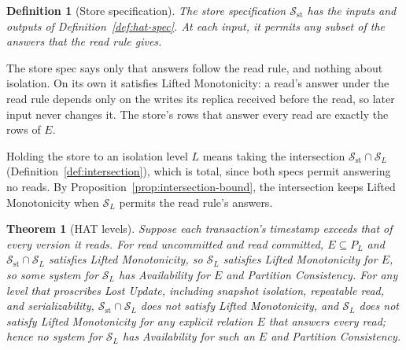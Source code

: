 \documentclass[sigconf]{cidr-2027}
\newtheorem{theorem}{Theorem}
\newtheorem{definition}{Definition}
\theoremstyle{remark}
\newcommand{\Spec}{\mathcal{S}}
\begin{document}
\begin{definition}[Store specification]
\label{def:store-spec}
The \emph{store specification} $\Spec_{\mathrm{st}}$ has the inputs and outputs
of Definition~\ref{def:hat-spec}. At each input, it permits any subset of the
answers that the read rule gives.
\end{definition}

The store spec says only that answers follow the read rule, and nothing about
isolation. On its own it satisfies Lifted Monotonicity: a read's answer under the read rule depends only on the writes its replica received
before the read, so later input never changes it. The store's rows that answer
every read are exactly the rows of $E$.

Holding the store to an isolation level $L$ means taking the intersection
$\Spec_{\mathrm{st}}\cap\Spec_L$ (Definition~\ref{def:intersection}), which
is total, since both specs permit
answering no reads. By Proposition~\ref{prop:intersection-bound}, the
intersection keeps Lifted Monotonicity when $\Spec_L$ permits the read rule's
answers.

\begin{theorem}[HAT levels]
\label{thm:hat-levels}
\textcolor{reviewed}{Suppose each transaction's timestamp exceeds that of every version it reads.} \textcolor{reviewed}{For read uncommitted and read committed, $E\subseteq P_L$ and
$\Spec_{\mathrm{st}}\cap\Spec_L$ satisfies Lifted Monotonicity, so $\Spec_L$
satisfies Lifted Monotonicity for $E$, so some system for $\Spec_L$ has
Availability for $E$ and Partition Consistency.} For any level that proscribes
Lost Update, including snapshot isolation, repeatable read, and
serializability, $\Spec_{\mathrm{st}}\cap\Spec_L$ does not satisfy Lifted
Monotonicity, and $\Spec_L$ does not satisfy Lifted Monotonicity for any
explicit relation $E$ that answers every read; hence no system for $\Spec_L$
has Availability for such an $E$ and Partition Consistency.
\end{theorem}
\end{document}
